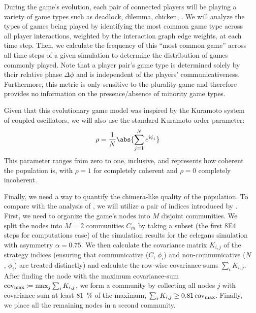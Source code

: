 \documentclass[pdflatex,lineno,referee,sn-mathphys-ay]{sn-jnl}
\begin{document}
During the game's evolution,
each pair of connected players will be playing a variety of game types
such as deadlock, dilemma, chicken, \etc{}
\citep[\cf{}][for definitions]{bruns2015names}.
We will analyze the types of games being played by
identifying the most common game type across all player interactions,
weighted by the interaction graph edge weights,
at each time step.
Then, we calculate the frequency of this ``most common game'' across
all time steps of a given simulation to determine the distribution
of games commonly played.
Note that a player pair's game type is determined solely
by their relative phase $\Delta \phi$ and is independent
of the players' communicativeness.
Furthermore, this metric is only sensitive to the
plurality game and therefore provides no information
on the presence/absence of minority game types.

Given that this evolutionary game model was inspired
by the Kuramoto system of coupled oscillators,
we will also use the standard Kuramoto order parameter:
\begin{equation}
  \rho = \frac{1}{N} \abs{\sum_{j=1}^N e^{\im \phi_j}}
  \label{eq:order_parameter}
\end{equation}
This parameter ranges from zero to one, inclusive,
and represents how coherent the population is,
with $\rho = 1$ for completely coherent and $\rho = 0$ completely incoherent.

Finally, we need a way to quantify
the chimera-like quality of the population.
To compare with the analysis of \citet{hizanidis2016chimera},
we will utilize a pair of indices introduced
by \citet{shanahan2010metastable}.
First, we need to organize the game's nodes
into $M$ disjoint communities.
We split the nodes into $M=2$ communities $C_m$
by taking a subset
(the first \num{8E4} steps for computations ease)
of the simulation results
for the \gls{celegans} simulation with asymmetry $\alpha = \num{0.75}$.
We then calculate the covariance matrix $K_{i,j}$ of the strategy indices
(ensuring that communicative ($C$, $\phi_i$)
and non-communicative ($N$, $\phi_i$) are treated distinctly)
and calculate the row-wise covariance-sums  $\sum_i K_{i,j}$.
After finding the node with the maximum covariance-sum
$\operatorname{cov}_{\text{max}} \coloneqq \max_j{\sum_i K_{i,j}}$,
we form a community by collecting all nodes $j$ with covariance-sum
at least \SI{81}{\percent} of the maximum,
$\sum_i K_{i,j} \ge \num{0.81} \operatorname{cov}_{\text{max}}$.
Finally, we place all the remaining nodes in a second community.
\end{document}
